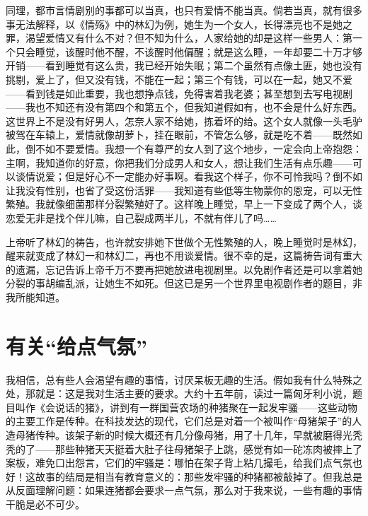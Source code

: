 同理，都市言情剧别的事都可以当真，也只有爱情不能当真。倘若当真，就有很多事无法解释，以《情殇》中的林幻为例，她生为一个女人，长得漂亮也不是她之罪，渴望爱情又有什么不对？但不知为什么，人家给她的却是这样一些男人：第一个只会睡觉，该醒时他不醒，不该醒时他偏醒；就是这么睡，一年却要二十万才够开销——看到睡觉有这么贵，我已经开始失眠；第二个虽然有点像土匪，她也没有挑剔，爱上了，但又没有钱，不能在一起；第三个有钱，可以在一起，她又不爱——看到钱是如此重要，我也想挣点钱，免得害着我老婆；甚至想到去写电视剧——我也不知还有没有第四个和第五个，但我知道假如有，也不会是什么好东西。这世界上不是没有好男人，怎奈人家不给她，拣着坏的给。这个女人就像一头毛驴被驾在车辕上，爱情就像胡萝卜，挂在眼前，不管怎么够，就是吃不着——既然如此，倒不如不要爱情。我想一个有尊严的女人到了这个地步，一定会向上帝抱怨：主啊，我知道你的好意，你把我们分成男人和女人，想让我们生活有点乐趣——可以谈情说爱；但是好心不一定能办好事啊。看我这个样子，你不可怜我吗？倒不如让我没有性别，也省了受这份活罪——我知道有些低等生物蒙你的恩宠，可以无性繁殖。我就像细菌那样分裂繁殖好了。这样晚上睡觉，早上一下变成了两个人，谈恋爱无非是找个伴儿嘛，自己裂成两半儿，不就有伴儿了吗…… 

上帝听了林幻的祷告，也许就安排她下世做个无性繁殖的人，晚上睡觉时是林幻，醒来就变成了林幻一和林幻二，再也不用谈爱情。很不幸的是，这篇祷告词有重大的遗漏，忘记告诉上帝千万不要再把她放进电视剧里。以免剧作者还是可以拿着她分裂的事胡编乱派，让她生不如死。但这已是另一个世界里电视剧作者的题目，非我所能知道。

\chapter{有关“给点气氛”}

我相信，总有些人会渴望有趣的事情，讨厌呆板无趣的生活。假如我有什么特殊之处，那就是：这是我对生活主要的要求。大约十五年前，读过一篇匈牙利小说，题目叫作《会说话的猪》，讲到有一群国营农场的种猪聚在一起发牢骚——这些动物的主要工作是传种。在科技发达的现代，它们总是对着一个被叫作“母猪架子”的人造母猪传种。该架子新的时候大概还有几分像母猪，用了十几年，早就被磨得光秃秃的了——那些种猪天天挺着大肚子往母猪架子上跳，感觉有如一砣冻肉被摔上了案板，难免口出怨言，它们的牢骚是：哪怕在架子背上粘几撮毛，给我们点气氛也好！这故事的结局是相当有教育意义的：那些发牢骚的种猪都被敲掉了。但我总是从反面理解问题：如果连猪都会要求一点气氛，那么对于我来说，一些有趣的事情干脆是必不可少。 

